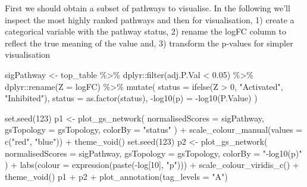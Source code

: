 \documentclass[9pt,a4paper,]{extarticle}
\newenvironment{Shaded}{\begin{snugshade}}{\end{snugshade}}
\newcommand{\AttributeTok}[1]{\textcolor[rgb]{0.77,0.63,0.00}{#1}}
\newcommand{\DecValTok}[1]{\textcolor[rgb]{0.00,0.00,0.81}{#1}}
\newcommand{\FloatTok}[1]{\textcolor[rgb]{0.00,0.00,0.81}{#1}}
\newcommand{\FunctionTok}[1]{\textcolor[rgb]{0.00,0.00,0.00}{#1}}
\newcommand{\NormalTok}[1]{#1}
\newcommand{\OtherTok}[1]{\textcolor[rgb]{0.56,0.35,0.01}{#1}}
\newcommand{\SpecialCharTok}[1]{\textcolor[rgb]{0.00,0.00,0.00}{#1}}
\newcommand{\StringTok}[1]{\textcolor[rgb]{0.31,0.60,0.02}{#1}}
\begin{document}
First we should obtain a subset of pathways to visualise.
In the following we'll inspect the most highly ranked pathways and then for visualisation, 1) create a categorical variable with the pathway status, 2) rename the logFC column to reflect the true meaning of the value and, 3) transform the p-values for simpler visualisation

\begin{Shaded}
\begin{Highlighting}[]
\NormalTok{sigPathway }\OtherTok{\textless{}{-}}\NormalTok{ top\_table }\SpecialCharTok{\%\textgreater{}\%} 
\NormalTok{  dplyr}\SpecialCharTok{::}\FunctionTok{filter}\NormalTok{(adj.P.Val }\SpecialCharTok{\textless{}} \FloatTok{0.05}\NormalTok{) }\SpecialCharTok{\%\textgreater{}\%} 
\NormalTok{  dplyr}\SpecialCharTok{::}\FunctionTok{rename}\NormalTok{(}\AttributeTok{Z =}\NormalTok{ logFC) }\SpecialCharTok{\%\textgreater{}\%} 
  \FunctionTok{mutate}\NormalTok{(}
    \AttributeTok{status =} \FunctionTok{ifelse}\NormalTok{(Z }\SpecialCharTok{\textgreater{}} \DecValTok{0}\NormalTok{, }\StringTok{"Activated"}\NormalTok{, }\StringTok{"Inhibited"}\NormalTok{),}
    \AttributeTok{status =} \FunctionTok{as.factor}\NormalTok{(status),}
    \StringTok{\textasciigrave{}}\AttributeTok{{-}log10(p)}\StringTok{\textasciigrave{}} \OtherTok{=} \SpecialCharTok{{-}}\FunctionTok{log10}\NormalTok{(P.Value)}
\NormalTok{  )}
\end{Highlighting}
\end{Shaded}

\begin{Shaded}
\begin{Highlighting}[]
\FunctionTok{set.seed}\NormalTok{(}\DecValTok{123}\NormalTok{)}
\NormalTok{p1 }\OtherTok{\textless{}{-}} \FunctionTok{plot\_gs\_network}\NormalTok{(}
  \AttributeTok{normalisedScores =}\NormalTok{ sigPathway, }\AttributeTok{gsTopology =}\NormalTok{ gsTopology, }\AttributeTok{colorBy =} \StringTok{"status"}
\NormalTok{) }\SpecialCharTok{+}
  \FunctionTok{scale\_colour\_manual}\NormalTok{(}\AttributeTok{values =} \FunctionTok{c}\NormalTok{(}\StringTok{"red"}\NormalTok{, }\StringTok{"blue"}\NormalTok{)) }\SpecialCharTok{+}
  \FunctionTok{theme\_void}\NormalTok{()}
\FunctionTok{set.seed}\NormalTok{(}\DecValTok{123}\NormalTok{)}
\NormalTok{p2 }\OtherTok{\textless{}{-}} \FunctionTok{plot\_gs\_network}\NormalTok{(}
  \AttributeTok{normalisedScores =}\NormalTok{ sigPathway,}
  \AttributeTok{gsTopology =}\NormalTok{ gsTopology, }
  \AttributeTok{colorBy  =} \StringTok{"{-}log10(p)"}
\NormalTok{) }\SpecialCharTok{+}
  \FunctionTok{labs}\NormalTok{(}\AttributeTok{colour =} \FunctionTok{expression}\NormalTok{(}\FunctionTok{paste}\NormalTok{(}\SpecialCharTok{{-}}\NormalTok{log[}\DecValTok{10}\NormalTok{], }\StringTok{"p"}\NormalTok{))) }\SpecialCharTok{+}
  \FunctionTok{scale\_colour\_viridis\_c}\NormalTok{() }\SpecialCharTok{+}
  \FunctionTok{theme\_void}\NormalTok{()}
\NormalTok{p1 }\SpecialCharTok{+}\NormalTok{ p2 }\SpecialCharTok{+} \FunctionTok{plot\_annotation}\NormalTok{(}\AttributeTok{tag\_levels =} \StringTok{"A"}\NormalTok{)}
\end{Highlighting}
\end{Shaded}
\end{document}
